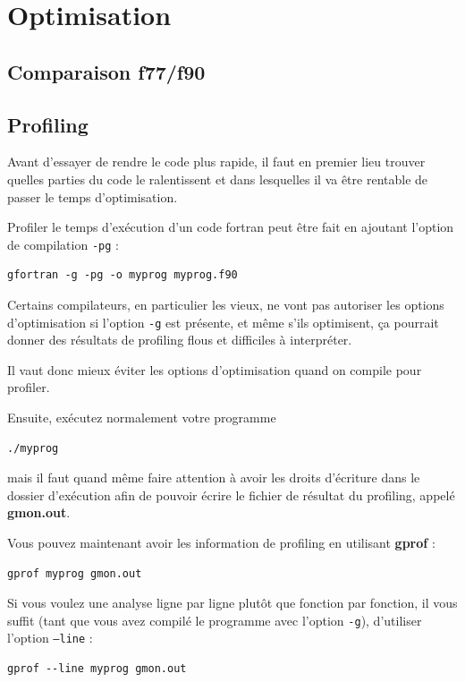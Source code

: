 \documentclass[a4paper,twoside]{article}
\begin{document}
\section{Optimisation}
\subsection{Comparaison f77/f90}
\subsection{Profiling}
Avant d'essayer de rendre le code plus rapide, il faut en premier lieu trouver quelles parties du code le ralentissent et dans lesquelles il va être rentable de passer le temps d'optimisation.

Profiler le temps d'exécution d'un code fortran peut être fait en ajoutant l'option de compilation \texttt{-pg} : 
\begin{verbatim}
gfortran -g -pg -o myprog myprog.f90
\end{verbatim}

\begin{remarque}
Certains compilateurs, en particulier les vieux, ne vont pas autoriser les options d'optimisation si l'option \texttt{-g} est présente, et même s'ils optimisent, ça pourrait donner des résultats de profiling flous et difficiles à interpréter. 

Il vaut donc mieux éviter les options d'optimisation quand on compile pour profiler. 
\end{remarque}

Ensuite, exécutez normalement votre programme
\begin{verbatim}
./myprog
\end{verbatim}
mais il faut quand même faire attention à avoir les droits d'écriture dans le dossier d'exécution afin de pouvoir écrire le fichier de résultat du profiling, appelé \textbf{gmon.out}. 

\bigskip

Vous pouvez maintenant avoir les information de profiling en utilisant \textbf{gprof} :
\begin{verbatim}
gprof myprog gmon.out
\end{verbatim}

\begin{remarque}
Si vous voulez une analyse ligne par ligne plutôt que fonction par fonction, il vous suffit (tant que vous avez compilé le programme avec l'option \texttt{-g}), d'utiliser l'option \texttt{--line} :
\begin{verbatim}
gprof --line myprog gmon.out
\end{verbatim}
\end{remarque}
\end{document}
